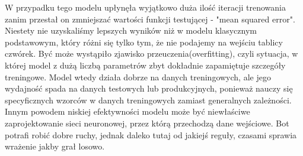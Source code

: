 \documentclass[12pt]{article}
\begin{document}
W przypadku tego modelu upłynęła wyjątkowo duża ilość iteracji trenowania zanim przestał on zmniejszać wartości funkcji testującej - "mean squared error". Niestety nie uzyskaliśmy lepszych wyników niż w modelu klasycznym podstawowym, który różni się tylko tym, że nie podajemy na wejściu tablicy czwórek. Być może wystąpiło zjawisko przeuczenia(overfitting), czyli sytuacja, w której model z dużą liczbą parametrów zbyt dokładnie zapamiętuje szczegóły treningowe. Model wtedy działa dobrze na danych treningowych, ale jego wydajność spada na danych testowych lub produkcyjnych, ponieważ nauczy się specyficznych wzorców w danych treningowych zamiast generalnych zależności. Innym powodem niskiej efektywności modelu może być niewłaściwe zaprojektowanie sieci neuronowej, przez którą przechodzą dane wejściowe. Bot potrafi robić dobre ruchy, jednak daleko tutaj od jakiejś reguły, czasami sprawia wrażenie jakby grał losowo.
\end{document}
